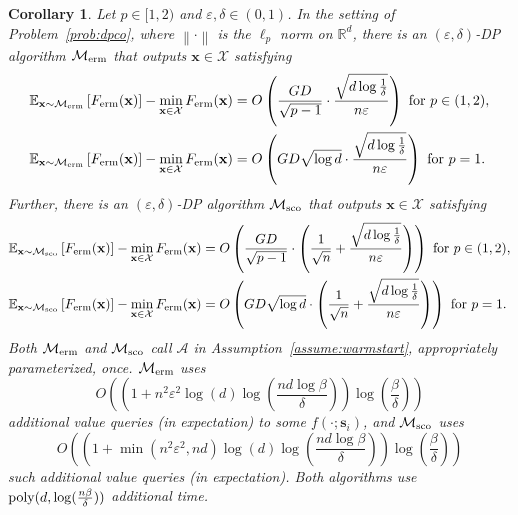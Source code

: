 \documentclass[11pt]{article}
\newtheorem{corollary}{Corollary}
\newcommand{\norm}[1]{\left\lVert#1\right\rVert}
\newcommand{\eps}{\epsilon}
\newcommand{\R}{\mathbb{R}}
\newcommand{\E}{\mathbb{E}}
\newcommand{\poly}{\textup{poly}}
\newcommand{\Par}[1]{\left(#1\right)}
\newcommand{\Brack}[1]{\left[#1\right]}
\newcommand{\0}{\mathbf{0}}
\newcommand{\1}{\mathbf{1}}
\newcommand{\vs}{\mathbf{s}}
\newcommand{\vx}{\mathbf{x}}
\newcommand{\calA}{\mathcal{A}}
\newcommand{\calM}{\mathcal{M}}
\newcommand{\calX}{\mathcal{X}}
\newcommand{\Ferm}{F_{\textup{erm}}}
\newcommand{\mecherm}{\calM_{\textup{erm}}}
\newcommand{\mechsco}{\calM_{\textup{sco}}}
\renewcommand{\epsilon}{\varepsilon}
\begin{document}
\begin{corollary}\label{cor:dp_sample}
Let $p \in [1, 2)$ and $\eps, \delta \in (0, 1)$. In the setting of Problem~\ref{prob:dpco}, where $\norm{\cdot}$ is the $\ell_p$ norm on $\R^d$, there is an $(\eps, \delta)$-DP algorithm $\calM_{\textup{erm}}$ that outputs $\vx \in \calX$ satisfying
\begin{align*}
\E_{\vx \sim \mecherm}\Brack{\Ferm(\vx)} - \min_{\vx \in \calX} \Ferm(\vx) &= O\Par{\frac{GD}{\sqrt{p - 1}} \cdot \frac{\sqrt{d\log \frac 1 \delta}}{n\eps}} \text{ for } p \in (1, 2), \\
\E_{\vx \sim \mecherm}\Brack{\Ferm(\vx)} - \min_{\vx \in \calX} \Ferm(\vx) &= O\Par{GD\sqrt{\log d} \cdot \frac{\sqrt{d\log \frac 1 \delta}}{n\eps}} \text{ for } p = 1.
\end{align*}
Further, there is an $(\eps, \delta)$-DP algorithm $\mechsco$ that outputs $\vx \in \calX$ satisfying
\begin{align*}
    \E_{\vx \sim \mechsco}\Brack{\Ferm(\vx)} - \min_{\vx \in \calX} \Ferm(\vx) &= O\Par{\frac{GD}{\sqrt{p - 1}} \cdot \Par{\frac 1 {\sqrt n} + \frac{\sqrt{d\log \frac 1 \delta}}{n\eps}} } \text{ for } p \in (1, 2), \\
\E_{\vx \sim \mechsco}\Brack{\Ferm(\vx)} - \min_{\vx \in \calX} \Ferm(\vx) &= O\Par{GD\sqrt{\log d} \cdot \Par{\frac 1 {\sqrt n} + \frac{\sqrt{d\log \frac 1 \delta}}{n\eps}}} \text{ for } p = 1.
\end{align*}
Both $\mecherm$ and $\mechsco$ call $\calA$ in Assumption~\ref{assume:warmstart}, appropriately parameterized, once. $\mecherm$ uses
\[O\Par{\Par{1 + n^2\eps^2\log(d)\log\Par{\frac{nd\log\beta}{\delta}}}\log\Par{\frac \beta \delta}}\]
additional value queries (in expectation) to some $f(\cdot; \vs_i)$, and $\mechsco$ uses
\[O\Par{\Par{1 + \min\Par{n^2\eps^2, nd}\log(d)\log\Par{\frac{nd\log\beta}{\delta} }}\log\Par{\frac \beta \delta}}\]
such additional value queries (in expectation). Both algorithms use $\poly(d, \log(\frac{n\beta}{\delta}))$ additional time.
\end{corollary}
\end{document}
